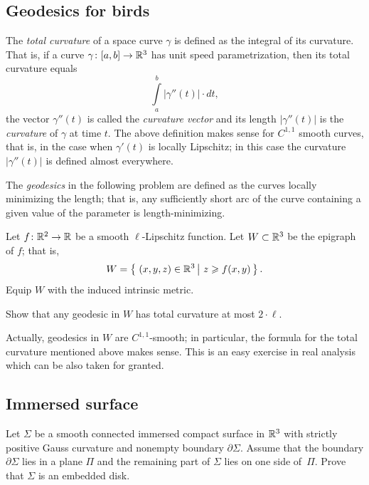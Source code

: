 \subsection*{Geodesics for birds}
\label{liberman}

The \emph{total curvature} of a space curve $\gamma$ is defined as the integral of its curvature.
That is, if a curve $\gamma\colon[a,b]\to\mathbb{R}^3$ has unit speed parametrization, 
then its total curvature equals 
\[\int\limits_a^b|\gamma''(t)|\cdot dt,\]
the vector $\gamma''(t)$ is called the \emph{curvature vector} and its length $|\gamma''(t)|$ is the \emph{curvature} of $\gamma$ at time $t$.
The above definition makes sense for $C^{1,1}$ smooth curves,
that is, in the case when $\gamma'(t)$ is locally Lipschitz;
in this case the curvature $|\gamma''(t)|$ is defined almost everywhere.

The \emph{geodesics} in the following problem are defined as the curves locally minimizing the length;
that is, any sufficiently short arc of the curve containing a given value of the parameter is length-minimizing.

\begin{pr}
Let $f\colon\mathbb{R}^2\to\mathbb{R}$ be a smooth $\ell$-Lipschitz function.
Let $W\subset \mathbb{R}^3$ be the epigraph of $f$;
that is,
$$W=\set{(x,y,z)\in\RR^3}{z\ge f(x,y)}.$$
Equip $W$ with the induced intrinsic metric.

Show that any geodesic in $W$ 
 has  total curvature at most $2\cdot\ell$.
\end{pr}

Actually, geodesics in $W$ are $C^{1,1}$-smooth;
in particular, the formula for the total curvature mentioned above makes sense.
This is an easy exercise in real analysis which can be also taken for granted.


\subsection*{Immersed surface}
\label{Immersed surface}

\begin{pr}
Let $\Sigma$ be a smooth connected immersed compact surface in $\mathbb{R}^3$ with strictly positive Gauss curvature and nonempty boundary $\partial\Sigma$.
Assume that the boundary $\partial\Sigma$ lies in a plane $\Pi$
and the remaining part of $\Sigma$ lies on one side of~$\Pi$.
Prove that $\Sigma$ is an embedded disk.
\end{pr}

